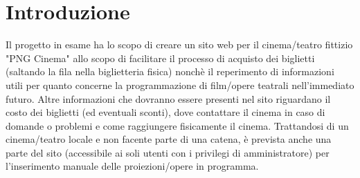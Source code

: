 \documentclass[a4paper, 12pt]{article}
\begin{document}
\makefrontpage

\section{Introduzione}
Il progetto in esame ha lo scopo di creare un sito web per il cinema/teatro fittizio "PNG Cinema" allo scopo di facilitare il processo di acquisto dei biglietti (saltando la fila nella biglietteria fisica) nonchè
il reperimento di informazioni utili per quanto concerne la programmazione di film/opere teatrali nell'immediato futuro.
Altre informazioni che dovranno essere presenti nel sito riguardano il costo dei biglietti (ed eventuali sconti), dove contattare il cinema in caso di domande o problemi e come raggiungere fisicamente il cinema.
Trattandosi di un cinema/teatro locale e non facente parte di una catena, è prevista anche una parte del sito (accessibile ai soli utenti con i privilegi di amministratore) per l'inserimento manuale delle proiezioni/opere in programma.
\end{document}
